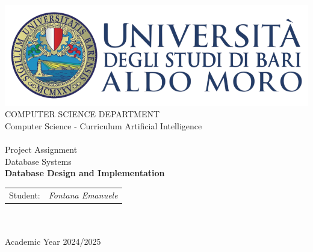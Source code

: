 \begin{titlepage}
    \begin{center}
        \includegraphics[scale=0.5]{images/uniba-logo.png}\\
        \vspace{0.5cm}
        {\large COMPUTER SCIENCE DEPARTMENT}\\
        \vspace{0.5cm}
        {\large Computer Science - Curriculum Artificial Intelligence}\\
        \hrulefill \\
        \vspace{0.5cm}
        {\large Project Assignment}\\
        \vspace{0.5cm}
        {\large Database Systems}\\
        \vspace{0.5cm}
        {\LARGE \textbf{Database Design and Implementation}}\\
        \vspace{0.5cm}

        \vfill
        \centering
        \begin{tabularx}{\textwidth}{@{}Xr@{}}
          {\large Student:} &
          {\large \textit{Fontana Emanuele}} \\ 
        \end{tabularx}
        \textcolor{white}{.} \\ 
        \vspace{0.5cm}
        \hrulefill \\
        {\large Academic Year 2024/2025}
    \end{center}
\end{titlepage}